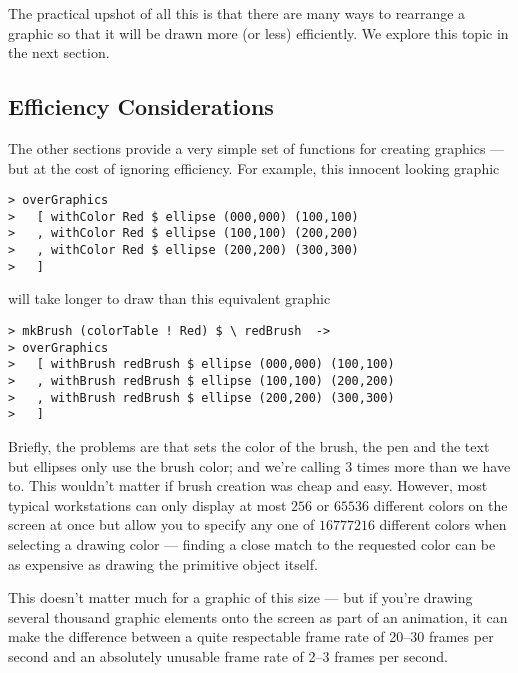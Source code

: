 
The practical upshot of all this is that there are many ways to
rearrange a graphic so that it will be drawn more (or less)
efficiently.  We explore this topic in the next section.


\subsection{Efficiency Considerations}\label{efficiency}

The other sections provide a very simple set of functions for creating
graphics --- but at the cost of ignoring efficiency.  For example, this
innocent looking graphic

\begin{verbatim}
> overGraphics
>   [ withColor Red $ ellipse (000,000) (100,100)
>   , withColor Red $ ellipse (100,100) (200,200)
>   , withColor Red $ ellipse (200,200) (300,300)
>   ]
\end{verbatim}

will take longer to draw than this equivalent graphic

\begin{verbatim}
> mkBrush (colorTable ! Red) $ \ redBrush  ->
> overGraphics
>   [ withBrush redBrush $ ellipse (000,000) (100,100)
>   , withBrush redBrush $ ellipse (100,100) (200,200)
>   , withBrush redBrush $ ellipse (200,200) (300,300)
>   ]
\end{verbatim}

Briefly, the problems are that  sets the color of the
brush, the pen and the text but ellipses only use the brush color;
and we're calling  $3$ times more than we have to.
This wouldn't matter if brush creation was cheap and easy.  However,
most typical workstations can only display at most $256$ or $65536$
different colors on the screen at once but allow you to specify any
one of $16777216$ different colors when selecting a drawing color
--- finding a close match to the requested color can be as
expensive as drawing the primitive object itself.


This doesn't matter much for a graphic of this size --- but if you're
drawing several thousand graphic elements onto the screen as part of
an animation, it can make the difference between a quite respectable
frame rate of 20--30 frames per second and an absolutely unusable
frame rate of 2--3 frames per second.

